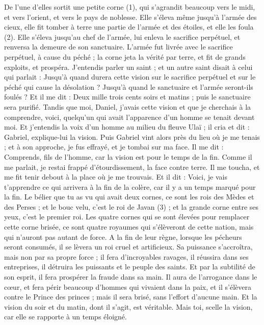 \begin{multicols}{2}
De l'une d'elles sortit une petite corne (1), qui s'agrandit beaucoup vers le midi, et vers l'orient, et vers le pays de noblesse.
Elle s’éleva même jusqu'à l'armée des cieux, elle fit tomber à terre une partie de l'armée et des étoiles, et elle les foula (2).
Elle s’éleva jusqu'au chef de l'armée, lui enleva le sacrifice perpétuel, et renversa la demeure de son sanctuaire.
L’armée fut livrée avec le sacrifice perpétuel, à cause du péché ; la corne jeta la vérité par terre, et fit de grands exploits, et prospéra.
J’entendis parler un saint ; et un autre saint disait à celui qui parlait : Jusqu'à quand durera cette vision sur  le sacrifice perpétuel et sur le péché qui cause la désolation ? Jusqu’à quand le sanctuaire et l'armée seront-ils foulés ?
Et il me dit : Deux mille trois cents soirs et matins ; puis le sanctuaire sera purifié.
Tandis que moi, Daniel, j’avais cette vision et que je cherchais à la comprendre, voici, quelqu’un qui avait l’apparence d'un homme se tenait devant moi.
Et j'entendis la voix d'un homme au milieu du fleuve Ulaï ; il cria et dit : Gabriel, explique-lui la vision.
Puis Gabriel vint alors près du lieu où je me tenais ; et à son approche, je fus effrayé, et je tombai sur ma face.  Il me dit : Comprends, fils de l’homme, car la vision est pour le temps de la fin.
Comme il me parlait, je restai frappé d’étourdissement, la face contre terre.  Il me toucha, et me fit tenir debout à la place où je me trouvais.
Et il dit : Voici, je vais t’apprendre ce qui arrivera à la fin de la colère, car il y a un temps marqué pour la fin.
Le bélier que tu as vu qui avait deux cornes, ce sont les rois des Mèdes et des Perses ;
et le bouc velu, c'est le roi de Javan (3) ; et la grande corne entre ses yeux, c'est le premier roi.
Les quatre cornes qui se sont élevées pour remplacer cette corne brisée, ce sont quatre royaumes qui s’élèveront de cette nation, mais qui n’auront pas autant de force.
A la fin de leur règne, lorsque les pécheurs seront consumés, il se lèvera un roi cruel et artificieux.
Sa puissance s'accroîtra, mais non par sa propre force ; il fera d’incroyables ravages, il réussira dans ses entreprises, il détruira les puissants et le peuple des saints.
Et par la subtilité de son esprit, il fera prospérer la fraude dans sa main. Il aura de l’arrogance dans le cœur, et fera périr beaucoup d’hommes qui vivaient dans la paix, et il s’élèvera contre le Prince des princes ; mais il sera brisé, sans l’effort d’aucune main.
Et la vision du soir et du matin, dont il s’agit, est véritable. Mais toi, scelle la vision, car elle se rapporte à un temps éloigné.

\end{multicols}
